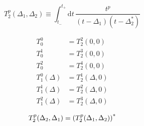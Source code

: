 \documentclass[english,notitlepage]{article}
\begin{document}
    \begin{equation}
        T_2^p(\Delta_1, \Delta_2) \equiv \int_{t_-}^{t_+}\!\mathrm{d}t\, \frac{t^p}{(t-\Delta_1)(t-\Delta_2^\ast)}
    \end{equation}

    \begin{subequations}
        \begin{align}
            T_0^0         & = T_2^2(0, 0)      \\
            T_0^1         & = T_2^3(0, 0)      \\
            T_0^2         & = T_2^4(0, 0)      \\
            T_1^0(\Delta) & = T_2^1(\Delta, 0) \\
            T_1^1(\Delta) & = T_2^2(\Delta, 0) \\
            T_1^2(\Delta) & = T_2^3(\Delta, 0)
        \end{align}
    \end{subequations}

    \[T_2^p(\Delta_2, \Delta_1) = \left(T_2^p(\Delta_1, \Delta_2)\right)^\ast\]
\end{document}
